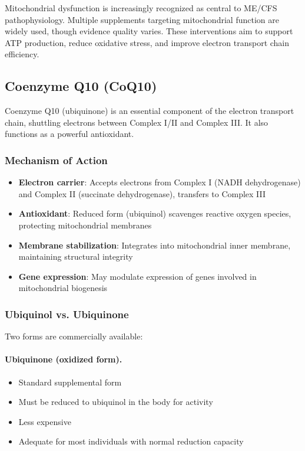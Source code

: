 Mitochondrial dysfunction is increasingly recognized as central to ME/CFS pathophysiology. Multiple supplements targeting mitochondrial function are widely used, though evidence quality varies. These interventions aim to support ATP production, reduce oxidative stress, and improve electron transport chain efficiency.

\subsection{Coenzyme Q10 (CoQ10)}

Coenzyme Q10 (ubiquinone) is an essential component of the electron transport chain, shuttling electrons between Complex I/II and Complex III. It also functions as a powerful antioxidant.

\subsubsection{Mechanism of Action}

\begin{itemize}
    \item \textbf{Electron carrier}: Accepts electrons from Complex I (NADH dehydrogenase) and Complex II (succinate dehydrogenase), transfers to Complex III
    \item \textbf{Antioxidant}: Reduced form (ubiquinol) scavenges reactive oxygen species, protecting mitochondrial membranes
    \item \textbf{Membrane stabilization}: Integrates into mitochondrial inner membrane, maintaining structural integrity
    \item \textbf{Gene expression}: May modulate expression of genes involved in mitochondrial biogenesis
\end{itemize}

\subsubsection{Ubiquinol vs. Ubiquinone}

Two forms are commercially available:

\paragraph{Ubiquinone (oxidized form).}
\begin{itemize}
    \item Standard supplemental form
    \item Must be reduced to ubiquinol in the body for activity
    \item Less expensive
    \item Adequate for most individuals with normal reduction capacity
\end{itemize}

